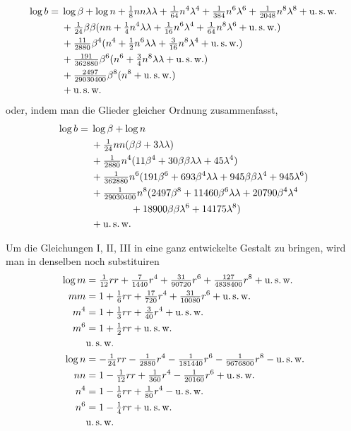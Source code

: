 \[
\begin{aligned}
\log b={}&\log\beta+\log n+\tfrac18nn\lambda\lambda+\tfrac1{64}n^4\lambda^4+\tfrac1{384}n^6\lambda^6+\tfrac1{2048}n^8\lambda^8+\text{u.\,s.\,w.}\\
&+\tfrac1{24}\beta\beta(nn+\tfrac14n^4\lambda\lambda+\tfrac1{16}n^6\lambda^4+\tfrac1{64}n^8\lambda^6+\text{u.\,s.\,w.})\\
&+\tfrac{11}{2880}\beta^4(n^4+\tfrac12n^6\lambda\lambda+\tfrac3{16}n^8\lambda^4+\text{u.\,s.\,w.})\\
&+\tfrac{191}{362880}\beta^6(n^6+\tfrac34n^8\lambda\lambda+\text{u.\,s.\,w.})\\
&+\tfrac{2497}{29030400}\beta^8(n^8+\text{u.\,s.\,w.})\\
&+\text{u.\,s.\,w.}
\end{aligned}
\]
oder, indem man die Glieder gleicher Ordnung zusammenfasst,
\[
\begin{aligned}
\log b={}&\log\beta+\log n\\
&+\tfrac1{24}nn(\beta\beta+3\lambda\lambda)\\
&+\tfrac1{2880}n^4(11\beta^4+30\beta\beta\lambda\lambda+45\lambda^4)\\
&+\tfrac1{362880}n^6(191\beta^6+693\beta^4\lambda\lambda+945\beta\beta\lambda^4+945\lambda^6)\\
&+\tfrac1{29030400}n^8(2497\beta^8+11460\beta^6\lambda\lambda+20790\beta^4\lambda^4\\
&\qquad\qquad+18900\beta\beta\lambda^6+14175\lambda^8)\\
&+\text{u.\,s.\,w.}
\end{aligned}
\]

\indent Um die Gleichungen I, II, III in eine ganz entwickelte Gestalt zu bringen, wird man in denselben noch substituiren
\[
\begin{aligned}
\log m&=\tfrac1{12}rr+\tfrac7{1440}r^4+\tfrac{31}{90720}r^6+\tfrac{127}{4838400}r^8+\text{u.\,s.\,w.}\\
mm&=1+\tfrac16rr+\tfrac{17}{720}r^4+\tfrac{31}{10080}r^6+\text{u.\,s.\,w.}\\
m^4&=1+\tfrac13rr+\tfrac3{40}r^4+\text{u.\,s.\,w.}\\
m^6&=1+\tfrac12rr+\text{u.\,s.\,w.}\\
&\text{u.\,s.\,w.}\\
\log n&=-\tfrac1{24}rr-\tfrac1{2880}r^4-\tfrac1{181440}r^6-\tfrac1{9676800}r^8-\text{u.\,s.\,w.}\\
nn&=1-\tfrac1{12}rr+\tfrac1{360}r^4-\tfrac1{20160}r^6+\text{u.\,s.\,w.}\\
n^4&=1-\tfrac16rr+\tfrac1{80}r^4-\text{u.\,s.\,w.}\\
n^6&=1-\tfrac14rr+\text{u.\,s.\,w.}\\
&\text{u.\,s.\,w.}
\end{aligned}
\]


